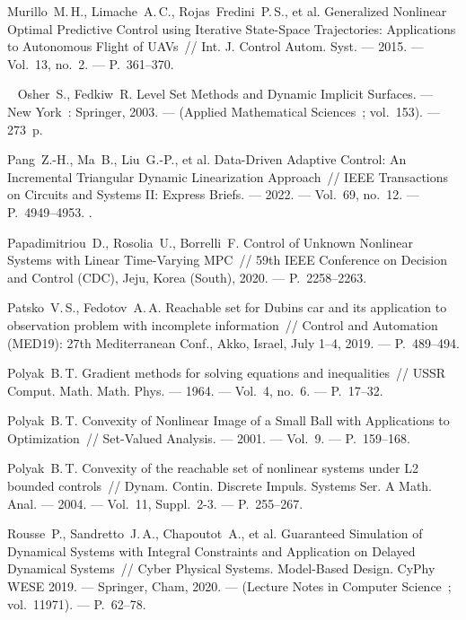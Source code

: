 \documentclass[../main.tex]{subfiles}
\begin{document}
\begin{thebibliography}{99}
Murillo~M.\,H., Limache~A.\,C., Rojas~Fredini~P.\,S., et al. Generalized Nonlinear Optimal Predictive Control using Iterative State-Space Trajectories: Applications to Autonomous Flight of UAVs~// Int. J. Control Autom. Syst. --- 2015. --- Vol.~13, no.~2. --- P.~361--370.

Osher~S., Fedkiw~R. Level Set Methods and Dynamic Implicit Surfaces. --- New York~: Springer, 2003. --- (Applied Mathematical Sciences~; vol.~153). --- 273~p.

Pang~Z.-H., Ma~B., Liu~G.-P., et al. Data-Driven Adaptive Control: An Incremental Triangular Dynamic Linearization Approach~// IEEE Transactions on Circuits and Systems II: Express Briefs. --- 2022. --- Vol.~69, no.~12. --- P.~4949--4953.
.

Papadimitriou~D., Rosolia~U., Borrelli~F. Control of Unknown Nonlinear Systems with Linear Time-Varying MPC~// 59th IEEE Conference on Decision and Control (CDC), Jeju, Korea (South), 2020. --- P.~2258--2263. 

Patsko~V.\,S., Fedotov~A.\,A. Reachable set for Dubins car and its application to observation problem with incomplete information~// Control and Automation (MED19): 27th Mediterranean Conf., Akko, Israel, July 1--4, 2019. --- P.~489--494.

Polyak~B.\,T. Gradient methods for solving equations and inequalities~// USSR Comput. Math. Math. Phys. --- 1964. --- Vol.~4, no.~6. --- P.~17--32.

Polyak~B.\,T. Convexity of Nonlinear Image of a Small Ball with Applications to Optimization~// Set-Valued Analysis. --- 2001. --- Vol.~9. --- P.~159--168. 

Polyak~B.\,T. Convexity of the reachable set of nonlinear systems under L2 bounded controls~// Dynam. Contin. Discrete Impuls. Systems Ser. A Math. Anal. --- 2004. --- Vol.~11, Suppl.~2-3. --- P.~255--267.

Rousse~P., Sandretto~J.\,A., Chapoutot~A., et al. Guaranteed Simulation of Dynamical Systems with Integral Constraints and Application on Delayed Dynamical Systems~// Cyber Physical Systems. Model-Based Design. CyPhy WESE 2019. --- Springer, Cham, 2020. --- (Lecture Notes in Computer Science~; vol.~11971). --- P.~62--78.


\end{thebibliography}
\end{document}
